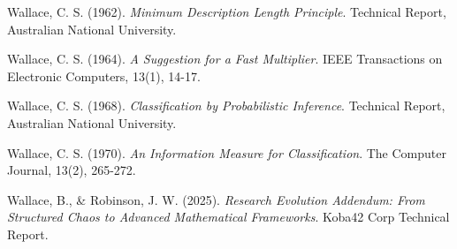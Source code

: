 \documentclass[12pt]{article}
\begin{document}
\begin{thebibliography}{99}

Wallace, C. S. (1962). \textit{Minimum Description Length Principle}. Technical Report, Australian National University.

Wallace, C. S. (1964). \textit{A Suggestion for a Fast Multiplier}. IEEE Transactions on Electronic Computers, 13(1), 14-17.

Wallace, C. S. (1968). \textit{Classification by Probabilistic Inference}. Technical Report, Australian National University.

Wallace, C. S. (1970). \textit{An Information Measure for Classification}. The Computer Journal, 13(2), 265-272.

Wallace, B., \& Robinson, J. W. (2025). \textit{Research Evolution Addendum: From Structured Chaos to Advanced Mathematical Frameworks}. Koba42 Corp Technical Report.

\end{thebibliography}
\end{document}
